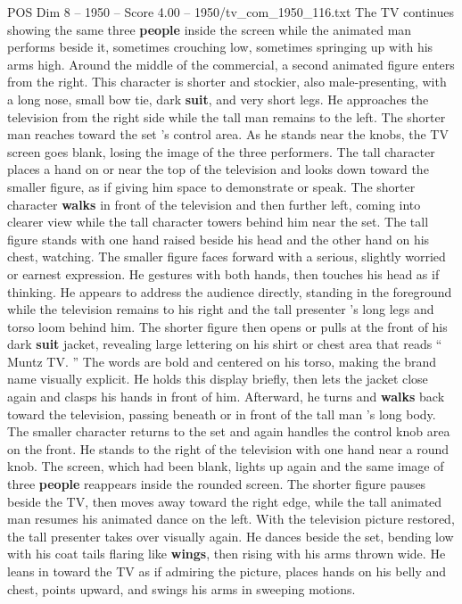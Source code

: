 \begin{textsample}{POS Dim 8 – 1950 – Score 4.00 – 1950/tv\_com\_1950\_116.txt}
The TV continues showing the same three \textbf{people} inside the screen while the animated man performs beside it, sometimes crouching low, sometimes springing up with his arms high.
Around the middle of the commercial, a second animated figure enters from the right.
This character is shorter and stockier, also male-presenting, with a long nose, small bow tie, dark \textbf{suit}, and very short legs.
He approaches the television from the right side while the tall man remains to the left.
The shorter man reaches toward the set ’s control area.
As he stands near the knobs, the TV screen goes blank, losing the image of the three performers.
The tall character places a hand on or near the top of the television and looks down toward the smaller figure, as if giving him space to demonstrate or speak.
The shorter character \textbf{walks} in front of the television and then further left, coming into clearer view while the tall character towers behind him near the set.
The tall figure stands with one hand raised beside his head and the other hand on his chest, watching.
The smaller figure faces forward with a serious, slightly worried or earnest expression.
He gestures with both hands, then touches his head as if thinking.
He appears to address the audience directly, standing in the foreground while the television remains to his right and the tall presenter ’s long legs and torso loom behind him.
The shorter figure then opens or pulls at the front of his dark \textbf{suit} jacket, revealing large lettering on his shirt or chest area that reads “ Muntz TV. ” The words are bold and centered on his torso, making the brand name visually explicit.
He holds this display briefly, then lets the jacket close again and clasps his hands in front of him.
Afterward, he turns and \textbf{walks} back toward the television, passing beneath or in front of the tall man ’s long body.
The smaller character returns to the set and again handles the control knob area on the front.
He stands to the right of the television with one hand near a round knob.
The screen, which had been blank, lights up again and the same image of three \textbf{people} reappears inside the rounded screen.
The shorter figure pauses beside the TV, then moves away toward the right edge, while the tall animated man resumes his animated dance on the left.
With the television picture restored, the tall presenter takes over visually again.
He dances beside the set, bending low with his coat tails flaring like \textbf{wings}, then rising with his arms thrown wide.
He leans in toward the TV as if admiring the picture, places hands on his belly and chest, points upward, and swings his arms in sweeping motions.

\end{textsample}
